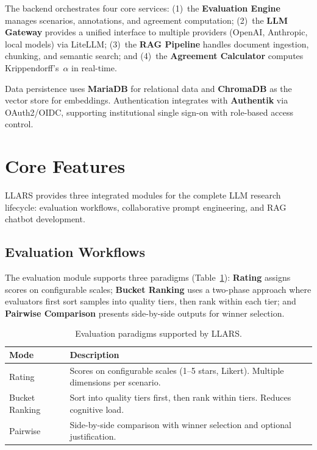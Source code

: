 \documentclass{article}
\begin{document}
The backend orchestrates four core services: (1)~the \textbf{Evaluation Engine} manages scenarios, annotations, and agreement computation; (2)~the \textbf{LLM Gateway} provides a unified interface to multiple providers (OpenAI, Anthropic, local models) via LiteLLM; (3)~the \textbf{RAG Pipeline} handles document ingestion, chunking, and semantic search; and (4)~the \textbf{Agreement Calculator} computes Krippendorff's~$\alpha$ in real-time.

Data persistence uses \textbf{MariaDB} for relational data and \textbf{ChromaDB} as the vector store for embeddings.
Authentication integrates with \textbf{Authentik} via OAuth2/OIDC, supporting institutional single sign-on with role-based access control.

\section{Core Features}

LLARS provides three integrated modules for the complete LLM research lifecycle: evaluation workflows, collaborative prompt engineering, and RAG chatbot development.

\subsection{Evaluation Workflows}

The evaluation module supports three paradigms (Table~\ref{tab:eval-modes}): \textbf{Rating} assigns scores on configurable scales; \textbf{Bucket Ranking} uses a two-phase approach where evaluators first sort samples into quality tiers, then rank within each tier; and \textbf{Pairwise Comparison} presents side-by-side outputs for winner selection.

\begin{table}[t]
\centering
\small
\begin{tabular}{@{}lp{5cm}@{}}
\toprule
\textbf{Mode} & \textbf{Description} \\
\midrule
Rating & Scores on configurable scales (1--5 stars, Likert). Multiple dimensions per scenario. \\
\addlinespace
Bucket Ranking & Sort into quality tiers first, then rank within tiers. Reduces cognitive load. \\
\addlinespace
Pairwise & Side-by-side comparison with winner selection and optional justification. \\
\bottomrule
\end{tabular}
\caption{Evaluation paradigms supported by LLARS.}
\label{tab:eval-modes}
\end{table}
\end{document}
